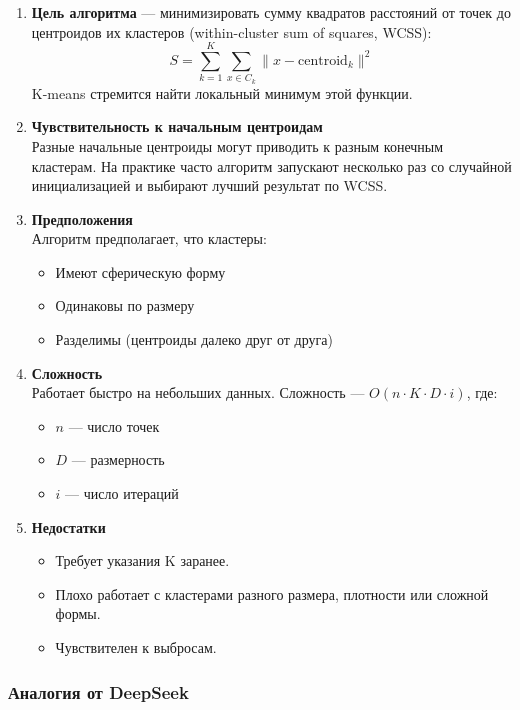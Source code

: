 \documentclass[11pt]{article}
\begin{document}
\begin{enumerate}
    \item \textbf{Цель алгоритма} — минимизировать сумму квадратов расстояний от точек до центроидов их кластеров (within-cluster sum of squares, WCSS):
    \[
    S = \sum_{k=1}^{K} \sum_{x \in C_k} \|x - \text{centroid}_k\|^2
    \]
    K-means стремится найти локальный минимум этой функции.
    
    \item \textbf{Чувствительность к начальным центроидам} \\
    Разные начальные центроиды могут приводить к разным конечным кластерам. На практике часто алгоритм запускают несколько раз со случайной инициализацией и выбирают лучший результат по WCSS.
    
    \item \textbf{Предположения} \\
    Алгоритм предполагает, что кластеры:
    \begin{itemize}
        \item Имеют сферическую форму
        \item Одинаковы по размеру
        \item Разделимы (центроиды далеко друг от друга)
    \end{itemize}
    
    \item \textbf{Сложность} \\
    Работает быстро на небольших данных. Сложность — $O(n \cdot K \cdot D \cdot i)$, где:
    \begin{itemize}
        \item $n$ — число точек
        \item $D$ — размерность
        \item $i$ — число итераций
    \end{itemize}
    
    \item \textbf{Недостатки}
    \begin{itemize}
        \item Требует указания K заранее.
        \item Плохо работает с кластерами разного размера, плотности или сложной формы.
        \item Чувствителен к выбросам.
    \end{itemize}
\end{enumerate}

\subsubsection{Аналогия от DeepSeek}
\end{document}
